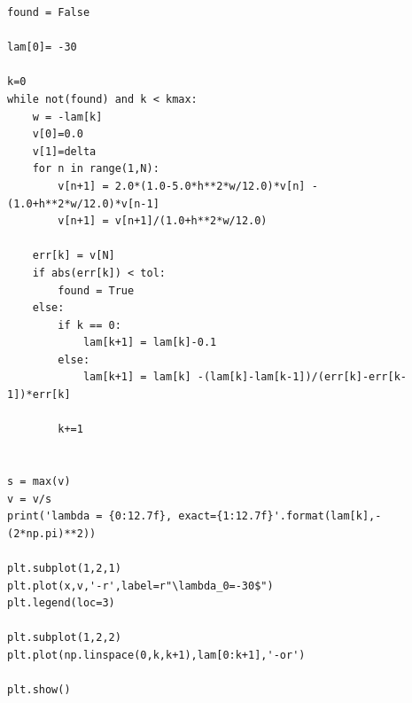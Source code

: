 \begin{verbatim}
found = False

lam[0]= -30

k=0
while not(found) and k < kmax:
    w = -lam[k]
    v[0]=0.0
    v[1]=delta
    for n in range(1,N):
        v[n+1] = 2.0*(1.0-5.0*h**2*w/12.0)*v[n] - (1.0+h**2*w/12.0)*v[n-1]
        v[n+1] = v[n+1]/(1.0+h**2*w/12.0)

    err[k] = v[N]
    if abs(err[k]) < tol:
        found = True
    else:
        if k == 0:
            lam[k+1] = lam[k]-0.1
        else:
            lam[k+1] = lam[k] -(lam[k]-lam[k-1])/(err[k]-err[k-1])*err[k]

        k+=1


s = max(v)
v = v/s
print('lambda = {0:12.7f}, exact={1:12.7f}'.format(lam[k],-(2*np.pi)**2))

plt.subplot(1,2,1)
plt.plot(x,v,'-r',label=r"\lambda_0=-30$")
plt.legend(loc=3)

plt.subplot(1,2,2)
plt.plot(np.linspace(0,k,k+1),lam[0:k+1],'-or')

plt.show()
\end{verbatim}
\normalsize


